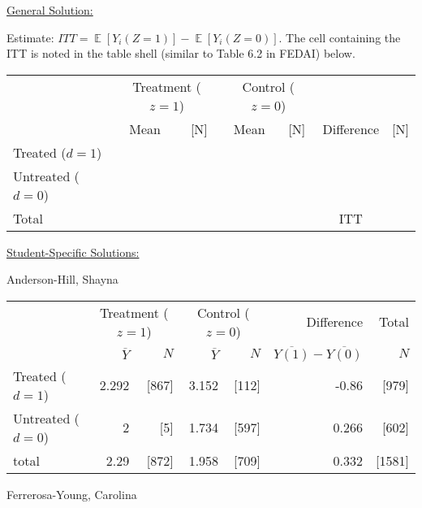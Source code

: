\documentclass[11pt,notitlepage]{article}
\def\E{\mathop{\mathbb{E}}}
\begin{document}
\vspace{1cm}

\underline{{\sc General Solution:}}

Estimate: $ITT = \E[Y_i(Z=1)] - \E[Y_i(Z=0)]$. The cell containing the ITT is noted in the table shell (similar to Table 6.2 in FEDAI) below.

\begin{table}[h!]\onehalfspacing\small
\begin{center}
\begin{tabular}{l|cc|cc|cc}
  \hline
  			       	& \multicolumn{2}{c|}{Treatment ($z=1$)} & \multicolumn{2}{c|}{Control ($z=0$)} & &	 \\
				\cline{2-5}
  		& Mean & [N] & Mean & [N] & Difference & [N] \\
  \hline
  Treated ($d=1$)	&  &  &  & &  &  \\
  Untreated 	($d=0$)	&  &  &  & &  &  \\
  \hline
  Total				&   &  &   & & ITT  & \\
  \hline
\end{tabular}
\end{center}
\end{table}

\underline{{\sc Student-Specific Solutions:}}

Anderson-Hill, Shayna

\begin{table}[h!]
\begin{center}
\begin{tabular}{l|rr|rr|rr}
  \hline
 & \multicolumn{2}{c|}{Treatment ($z=1$)} & \multicolumn{2}{c|}{Control ($z=0$)} & Difference & Total \\
 & $\overline{Y}$ & $N$ & $\overline{Y}$ & $N$ & $\overline{Y(1)} - \overline{Y(0)}$ & $N$ \\ 
  \hline
Treated ($d=1$) &  2.292 & [867] & 3.152 & [112] & -0.86 & [979] \\ 
  Untreated ($d=0$) & 2 & [5] & 1.734 & [597] & 0.266 & [602] \\ 
\hline
  total & 2.29 & [872] & 1.958 & [709] & 0.332 & [1581] \\ 
   \hline
\end{tabular}
\end{center}
\end{table}

Ferrerosa-Young, Carolina
\end{document}

